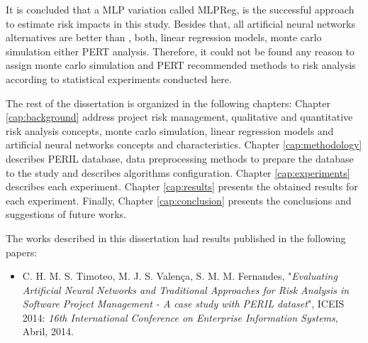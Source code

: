 It is concluded that a MLP variation called MLPReg, is the successful approach to estimate risk impacts in this study. Besides that, all artificial neural networks alternatives are better than , both, linear regression models, monte carlo simulation either PERT analysis. Therefore, it could not be found any reason to assign monte carlo simulation and PERT recommended methods to risk analysis according to statistical experiments conducted here.

The rest of the dissertation is organized in the following chapters: Chapter \ref{cap:background} address project risk management, qualitative and quantitative risk analysis concepts, monte carlo simulation, linear regression models and artificial neural networks concepts and characteristics. Chapter \ref{cap:methodology} describes PERIL database, data preprocessing methods to prepare the database to the study and describes algorithms configuration. Chapter \ref{cap:experiments} describes each experiment. Chapter \ref{cap:results} presents the obtained results for each experiment. Finally, Chapter \ref{cap:conclusion} presents the conclusions and suggestions of future works.

The works described in this dissertation had results published in the following papers:
\begin{itemize}
\item C. H. M. S. Timoteo, M. J. S. Valença, S. M. M. Fernandes, "\textit{Evaluating Artificial Neural Networks and Traditional Approaches for Risk Analysis in Software Project Management - A case study with PERIL dataset}", ICEIS 2014: \textit{16th International Conference on Enterprise Information Systems}, Abril, 2014.
\end{itemize}

